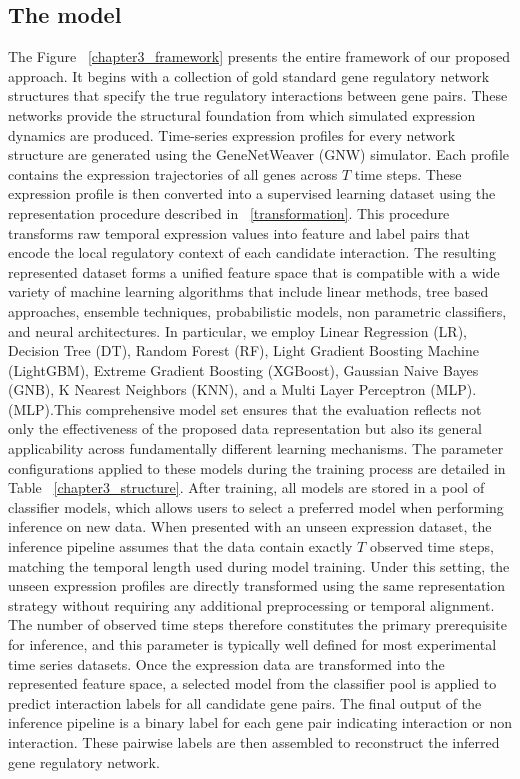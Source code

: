\subsection{The model}
The Figure ~\ref{chapter3_framework} presents the entire framework of our proposed approach. It begins with a collection of gold standard gene regulatory network structures that specify the true regulatory interactions between gene pairs. These networks provide the structural foundation from which simulated expression dynamics are produced. Time-series expression profiles for every network structure are generated using the GeneNetWeaver (GNW) simulator. Each profile contains the expression trajectories of all genes across \(T\) time steps. These expression profile is then converted into a supervised learning dataset using the representation procedure described in ~\ref{transformation}. This procedure transforms raw temporal expression values into feature and label pairs that encode the local regulatory context of each candidate interaction. The resulting represented dataset forms a unified feature space that is compatible with a wide variety of machine learning algorithms that include linear methods, tree based approaches, ensemble techniques, probabilistic models, non parametric classifiers, and neural architectures. In particular, we employ Linear Regression (LR), Decision Tree (DT), Random Forest (RF), Light Gradient Boosting Machine (LightGBM), Extreme Gradient Boosting (XGBoost), Gaussian Naive Bayes (GNB), K Nearest Neighbors (KNN), and a Multi Layer Perceptron (MLP). (MLP).This comprehensive model set ensures that the evaluation reflects not only the effectiveness of the proposed data representation but also its general applicability across fundamentally different learning mechanisms. The parameter configurations applied to these models during the training process are detailed in Table ~\ref {chapter3_structure}. After training, all models are stored in a pool of classifier models, which allows users to select a preferred model when performing inference on new data. When presented with an unseen expression dataset, the inference pipeline assumes that the data contain exactly \(T\) observed time steps, matching the temporal length used during model training. Under this setting, the unseen expression profiles are directly transformed using the same representation strategy without requiring any additional preprocessing or temporal alignment. The number of observed time steps therefore constitutes the primary prerequisite for inference, and this parameter is typically well defined for most experimental time series datasets. Once the expression data are transformed into the represented feature space, a selected model from the classifier pool is applied to predict interaction labels for all candidate gene pairs. The final output of the inference pipeline is a binary label for each gene pair indicating interaction or non interaction. These pairwise labels are then assembled to reconstruct the inferred gene regulatory network.

